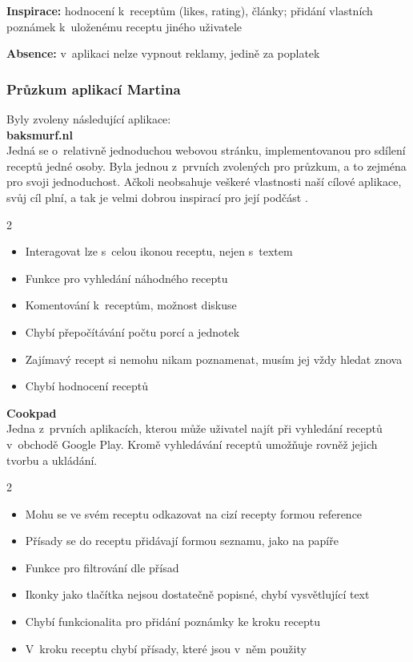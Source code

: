 \documentclass[a4paper, 11pt]{article}
\newcommand{\sss}[1]{\subsubsection{#1}} %
\newcommand{\plus}{\textbf{\color{ForestGreen}+}}
\renewcommand{\minus}{\textbf{\color{Red}-}}
\begin{document}
    \textbf{Inspirace:} hodnocení k~receptům (likes, rating), články;
    přidání vlastních poznámek k~uloženému receptu jiného uživatele

    \textbf{Absence:} v~aplikaci nelze vypnout reklamy, jedině za poplatek

    \sss{Průzkum aplikací Martina}
    
    Byly zvoleny následující aplikace: \\

    \noindent\textbf{baksmurf.nl} \\
    Jedná se o~relativně jednoduchou webovou stránku, implementovanou pro sdílení receptů
    jedné osoby. Byla jednou z~prvních zvolených pro průzkum, a to zejména pro
    svoji jednoduchost. Ačkoli neobsahuje veškeré vlastnosti naší cílové aplikace,
    svůj cíl plní, a tak je velmi dobrou inspirací pro její podčást .

    \begin{multicols}{2}
    \begin{itemize}
        \item[\textbf{\plus}] Interagovat lze s~celou ikonou receptu, nejen s~textem
        \item[\textbf{\plus}] Funkce  pro vyhledání náhodného receptu
        \item[\textbf{\plus}] Komentování k~receptům, možnost diskuse
        \item[\textbf{\minus}] Chybí přepočítávání počtu porcí a jednotek
        \item[\textbf{\minus}] Zajímavý recept si nemohu nikam poznamenat, musím jej vždy hledat znova
        \item[\textbf{\minus}] Chybí hodnocení receptů
    \end{itemize}
    \end{multicols}

    \noindent\textbf{Cookpad} \\
    Jedna z~prvních aplikacích, kterou může uživatel najít při vyhledání receptů
    v~obchodě Google Play. Kromě vyhledávání receptů umožňuje rovněž jejich tvorbu
    a ukládání.

    \begin{multicols}{2}
    \begin{itemize}
        \item[\textbf{\plus}] Mohu se ve svém receptu odkazovat na cizí recepty formou reference
        \item[\textbf{\plus}] Přísady se do receptu přidávají formou seznamu, jako na papíře
        \item[\textbf{\plus}] Funkce  pro filtrování dle přísad
        \item[\textbf{\minus}] Ikonky jako tlačítka nejsou dostatečně popisné, chybí vysvětlující text
        \item[\textbf{\minus}] Chybí funkcionalita pro přidání poznámky ke kroku receptu
        \item[\textbf{\minus}] V~kroku receptu chybí přísady, které jsou v~něm použity
    \end{itemize}
    \end{multicols}
\end{document}
